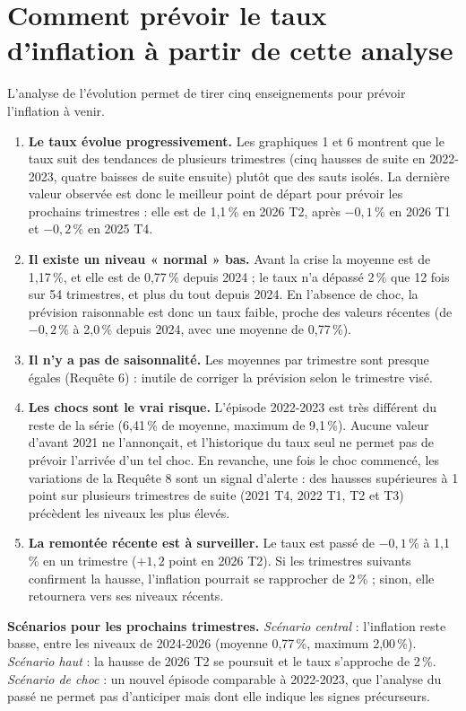 \documentclass[11pt,a4paper]{article}
\begin{document}
\section{Comment prévoir le taux d'inflation à partir de cette analyse}
L'analyse de l'évolution permet de tirer cinq enseignements pour prévoir l'inflation à venir.

\begin{enumerate}[leftmargin=1.5em]
  \item \textbf{Le taux évolue progressivement.} Les graphiques 1 et 6 montrent que le taux suit des tendances de plusieurs trimestres (cinq hausses de suite en 2022-2023, quatre baisses de suite ensuite) plutôt que des sauts isolés. La dernière valeur observée est donc le meilleur point de départ pour prévoir les prochains trimestres : elle est de 1,1\,\% en 2026 T2, après $-0{,}1$\,\% en 2026 T1 et $-0{,}2$\,\% en 2025 T4.
  \item \textbf{Il existe un niveau « normal » bas.} Avant la crise la moyenne est de 1,17\,\%, et elle est de 0,77\,\% depuis 2024 ; le taux n'a dépassé 2\,\% que 12 fois sur 54 trimestres, et plus du tout depuis 2024. En l'absence de choc, la prévision raisonnable est donc un taux faible, proche des valeurs récentes (de $-0{,}2$\,\% à 2,0\,\% depuis 2024, avec une moyenne de 0,77\,\%).
  \item \textbf{Il n'y a pas de saisonnalité.} Les moyennes par trimestre sont presque égales (Requête 6) : inutile de corriger la prévision selon le trimestre visé.
  \item \textbf{Les chocs sont le vrai risque.} L'épisode 2022-2023 est très différent du reste de la série (6,41\,\% de moyenne, maximum de 9,1\,\%). Aucune valeur d'avant 2021 ne l'annonçait, et l'historique du taux seul ne permet pas de prévoir l'arrivée d'un tel choc. En revanche, une fois le choc commencé, les variations de la Requête 8 sont un signal d'alerte : des hausses supérieures à 1 point sur plusieurs trimestres de suite (2021 T4, 2022 T1, T2 et T3) précèdent les niveaux les plus élevés.
  \item \textbf{La remontée récente est à surveiller.} Le taux est passé de $-0{,}1$\,\% à 1,1\,\% en un trimestre ($+1{,}2$ point en 2026 T2). Si les trimestres suivants confirment la hausse, l'inflation pourrait se rapprocher de 2\,\% ; sinon, elle retournera vers ses niveaux récents.
\end{enumerate}

\textbf{Scénarios pour les prochains trimestres.} \emph{Scénario central} : l'inflation reste basse, entre les niveaux de 2024-2026 (moyenne 0,77\,\%, maximum 2,00\,\%). \emph{Scénario haut} : la hausse de 2026 T2 se poursuit et le taux s'approche de 2\,\%. \emph{Scénario de choc} : un nouvel épisode comparable à 2022-2023, que l'analyse du passé ne permet pas d'anticiper mais dont elle indique les signes précurseurs.
\end{document}
